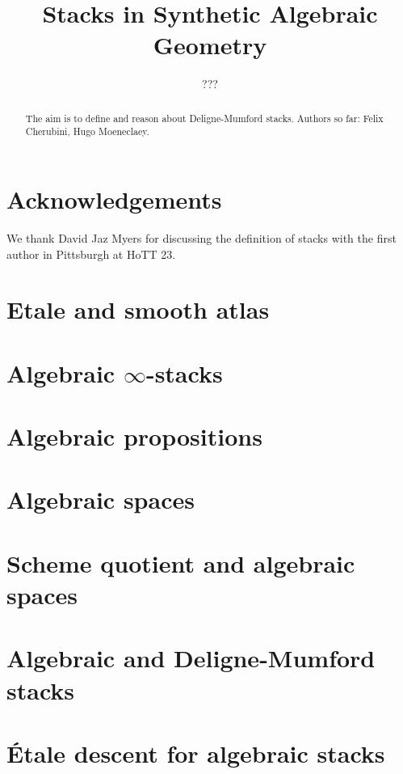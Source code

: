 \documentclass{../util/zariski}
\title{Stacks in Synthetic Algebraic Geometry}
\author{???}
\begin{document}
\maketitle

\begin{abstract}
  The aim is to define and reason about Deligne-Mumford stacks.
  Authors so far: Felix Cherubini, Hugo Moeneclaey.
\end{abstract}

\section*{Acknowledgements}
We thank David Jaz Myers for discussing the definition of stacks with the first author in Pittsburgh at HoTT 23.

\tableofcontents

\section{Etale and smooth atlas}


\section{Algebraic $\infty$-stacks}


\section{Algebraic propositions}


\section{Algebraic spaces}


\section{Scheme quotient and algebraic spaces}


\section{Algebraic and Deligne-Mumford stacks}


\section{Étale descent for algebraic stacks}



\printindex

\printbibliography
\end{document}
